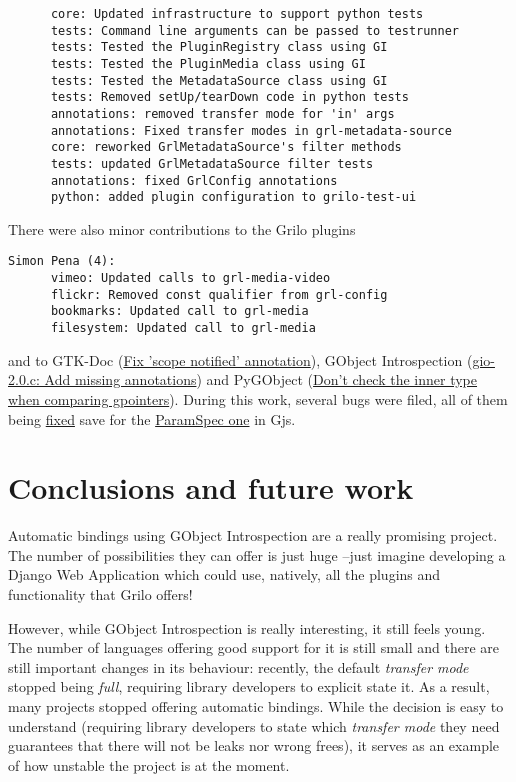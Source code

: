 \begin{verbatim}
      core: Updated infrastructure to support python tests
      tests: Command line arguments can be passed to testrunner
      tests: Tested the PluginRegistry class using GI
      tests: Tested the PluginMedia class using GI
      tests: Tested the MetadataSource class using GI
      tests: Removed setUp/tearDown code in python tests
      annotations: removed transfer mode for 'in' args
      annotations: Fixed transfer modes in grl-metadata-source
      core: reworked GrlMetadataSource's filter methods
      tests: updated GrlMetadataSource filter tests
      annotations: fixed GrlConfig annotations
      python: added plugin configuration to grilo-test-ui
\end{verbatim}

There were also minor contributions to the Grilo plugins

\begin{verbatim}
Simon Pena (4):
      vimeo: Updated calls to grl-media-video
      flickr: Removed const qualifier from grl-config
      bookmarks: Updated call to grl-media
      filesystem: Updated call to grl-media
\end{verbatim}

and to GTK-Doc (\href{http://git.gnome.org/browse/gtk-doc/commit/?id=50636742ee71fabd6fc306c4da53d2c431497f44}{Fix 'scope notified' annotation}), GObject Introspection
(\href{http://git.gnome.org/browse/gobject-introspection/commit/?id=ac29006d8481b8c8900672cfae834c12712ff2e6}{gio-2.0.c: Add missing annotations}) and PyGObject
(\href{http://git.gnome.org/browse/pygobject/commit/?id=28ed01c34c503cfb4f14fe7af7912060ca70aba6}{Don't check the inner type when comparing gpointers}).
During this work, several bugs were filed, all of them being \href{https://bugzilla.gnome.org/buglist.cgi?bug_status=RESOLVED,VERIFIED,CLOSED&emailreporter1=1&emailtype1=exact&email1=spenap%40gmail.com}{fixed} save
for the \href{https://bugzilla.gnome.org/show_bug.cgi?id=626047}{ParamSpec one} in Gjs.

\section{Conclusions and future work}

Automatic bindings using GObject Introspection are a really promising project. The
number of possibilities they can offer is just huge --just imagine developing a
Django Web Application which could use, natively, all the plugins and
functionality that Grilo offers!

However, while GObject Introspection is really interesting, it still feels young. The
number of languages offering good support for it is still small and there are still
important changes in its behaviour: recently, the default {\it transfer mode} stopped
being {\it full}, requiring library developers to explicit state it. As a result,
many projects stopped offering automatic bindings. While the decision is easy to
understand (requiring library developers to state which {\it transfer mode} they need
guarantees that there will not be leaks nor wrong frees), it serves as an example of
how unstable the project is at the moment.

